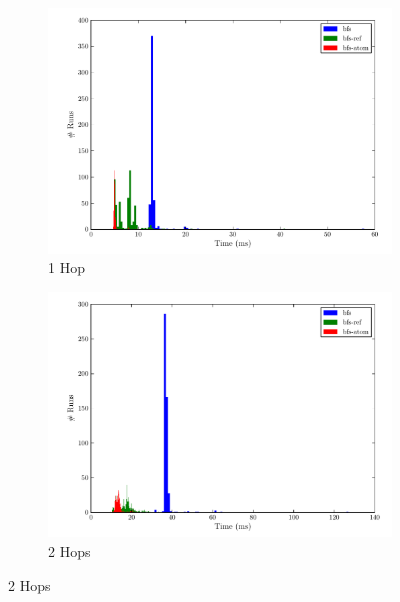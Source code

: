 				\begin{figure}
					\begin{subfigure}[b]{.5\linewidth}
						\includegraphics[scale=0.45]{figures/charts/1_hops.pdf}
						\caption{1 Hop}
						\label{subfig:1-hop}
					\end{subfigure}
					\begin{subfigure}[b]{.5\linewidth}
						\includegraphics[scale=0.45]{figures/charts/2_hops.pdf}
						\caption{2 Hops}
						\label{subfig:2-hops}
					\end{subfigure}
				\end{figure}
